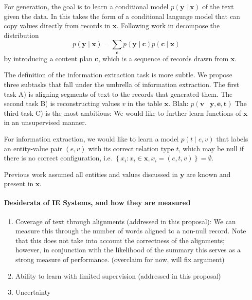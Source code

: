 \documentclass[11pt]{article}
\newcommand\set[1]{\left\{#1\right\}}
\newcommand{\bc}{\mathbf{c}}
\newcommand{\be}{\mathbf{e}}
\newcommand{\bt}{\mathbf{t}}
\newcommand{\bv}{\mathbf{v}}
\newcommand{\bx}{\mathbf{x}}
\newcommand{\by}{\mathbf{y}}
\begin{document}
For generation, the goal is to learn a conditional model $p(\by\mid\bx)$ of the text given the data.
In \citet{wiseman2017d2t} this takes the form of a conditional language model that can copy values directly from records in $\bx$.
Following work in \citet{puduppully2018contentselection} decompose the distribution 
\begin{equation}
p(\by\mid\bx) = \sum_{\bc}p(\by\mid\bc)p(\bc\mid\bx)
\end{equation}
by introducing a content plan $\bc$, which is a sequence of records drawn from $\bx$.

The definition of the information extraction task is more subtle.
We propose three subtasks that fall under the umbrella of information extraction.
The first task A) is aligning segments of text to the records that generated them.
The second task B) is reconstructing values $v$ in the table $\bx$.
Blah: $p(\bv \mid \by,\be,\bt)$
The third task C) is the most ambitious: We would like to further learn 
functions of $\bx$ in an unsupervised manner.

For information extraction, we would like to learn a model $p(t\mid e,v)$ that labels an entity-value pair $(e,v)$
with its correct relation type $t$, which may be null if there is no correct configuration, i.e.
$\set{x_i:x_i\in\bx, x_i = (e,t,v)}=\emptyset$.

Previous work assumed all entities and values discussed in $\by$ are known and present in $\bx$.

\paragraph{Desiderata of IE Systems, and how they are measured}
\begin{enumerate}
\item Coverage of text through alignments (addressed in this proposal):
We can measure this through the number of words aligned to a non-null record.
Note that this does not take into account the correctness of the alignments;
however, in conjunction with the likelihood of the summary this serves
as a strong measure of performance. (overclaim for now, will fix argument)
\item Ability to learn with limited supervision (addressed in this proposal)
\item Uncertainty
\end{enumerate}
\end{document}
